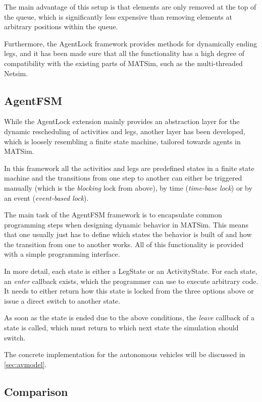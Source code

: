 The main advantage of this setup is that elements are only removed at the top
of the queue, which is significantly less expensive than removing elements at
arbitrary positions within the queue.

Furthermore, the AgentLock framework provides methods for dynamically ending legs,
and it has been made sure that all the functionality has a high degree of compatibility
with the existing parts of MATSim, such as the multi-threaded Netsim.

\subsection{AgentFSM}

While the AgentLock extension mainly provides an abstraction layer for the dynamic
rescheduling of activities and legs, another layer has been developed, which is
loosely resembling a finite state machine, tailored towards agents in
MATSim.

In this framework all the activities and legs are predefined states in a finite
state machine and the transitions from one step to another can either be triggered
manually (which is the \textit{blocking} lock from above), by time (\textit{time-base lock})
or by an event (\textit{event-based lock}).

The main task of the AgentFSM framework is to encapsulate common programming steps
when designing dynamic behavior in MATSim. This means that one usually just has
to define which states the behavior is built of and how the transition from one
to another works. All of this functionality is provided with a simple programming
interface.

In more detail, each state is either a LegState or an ActivityState. For each state,
an \textit{enter} callback exists, which the programmer can use to execute arbitrary
code. It needs to either return how this state is locked from the three options above or
issue a direct switch to another state.

As soon as the state is ended due to the above conditions, the \textit{leave} callback
of a state is called, which must return to which next state the simulation should
switch.

The concrete implementation for the autonomous vehicles will be discussed in \cref{sec:avmodel}.

\subsection{Comparison}

